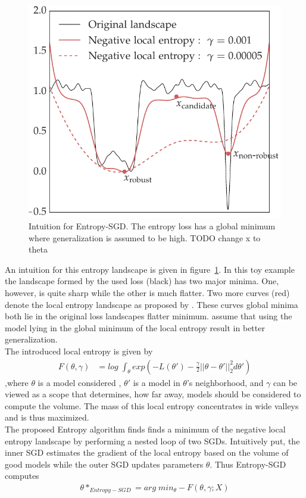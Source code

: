 \documentclass[a4paper]{scrartcl}
\begin{document}
\begin{figure}[H]
	\centering
	\includegraphics[width=.6\linewidth]{figures/entropy_1.png}
	\caption{Intuition for Entropy-SGD. The entropy loss has a global minimum where generalization is assumed to be high. TODO change x to theta}
	\label{fig:entropy}
\end{figure}
An intuition for this entropy landscape is given in figure~\ref{fig:entropy}. In this toy example the landscape formed by the used loss (black) has two major minima. One, however, is quite sharp while the other is much flatter. Two more curves (red) denote the local entropy landscape as proposed by \cite{chaudhari2019entropy}. These curves global minima both lie in the original loss landscapes flatter minimum. \cite{chaudhari2019entropy} assume that using the model lying in the global minimum of the local entropy result in better generalization.\\
The introduced local entropy is given by
\begin{align}
	F(\theta, \gamma) &= log\; \int_\theta exp(-L(\theta') - \frac{\gamma}{2}||\theta-\theta'||_2^2 d\theta') 
\end{align},where $\theta$ is a model considered , $\theta'$ is a model in $\theta$'s neighborhood, and $\gamma$ can be viewed as a scope that determines, how far away, models should be considered to compute the volume. The mass of this local entropy concentrates in wide valleys and is thus maximized.\\
The proposed Entropy algorithm finds finds a minimum of the negative local entropy landscape by performing a nested loop of two SGDs. Intuitively put, the inner SGD estimates the gradient of the local entropy based on the volume of good models while the outer SGD updates parameters $\theta$. Thus Entropy-SGD computes
\begin{align*}
	\theta*_{Entropy-SGD} = arg\;min_{\theta} - F(\theta, \gamma; X)
\end{align*}
\end{document}
